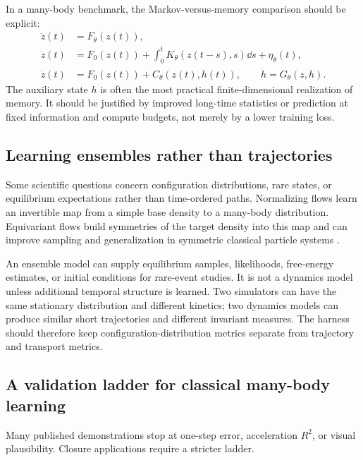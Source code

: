 In a many-body benchmark, the Markov-versus-memory comparison should be explicit:
\begin{align}
\dot z(t)
&=
F_\theta(z(t)),
\\
\dot z(t)
&=
F_0(z(t))
+\int_0^t K_\theta(z(t-s),s)\dd s
+\eta_\theta(t),
\\
\dot z(t)
&=
F_0(z(t))+C_\theta(z(t),h(t)),
\qquad
\dot h=G_\theta(z,h).
\end{align}
The auxiliary state \(h\) is often the most practical finite-dimensional realization of memory. It should be justified by improved long-time statistics or prediction at fixed information and compute budgets, not merely by a lower training loss.

\subsection{Learning ensembles rather than trajectories}

Some scientific questions concern configuration distributions, rare states, or equilibrium expectations rather than time-ordered paths. Normalizing flows learn an invertible map from a simple base density to a many-body distribution. Equivariant flows build symmetries of the target density into this map and can improve sampling and generalization in symmetric classical particle systems \citep{kohler2020equivariantflows}.

An ensemble model can supply equilibrium samples, likelihoods, free-energy estimates, or initial conditions for rare-event studies. It is not a dynamics model unless additional temporal structure is learned. Two simulators can have the same stationary distribution and different kinetics; two dynamics models can produce similar short trajectories and different invariant measures. The harness should therefore keep configuration-distribution metrics separate from trajectory and transport metrics.

\subsection{A validation ladder for classical many-body learning}

Many published demonstrations stop at one-step error, acceleration \(R^2\), or visual plausibility. Closure applications require a stricter ladder.


